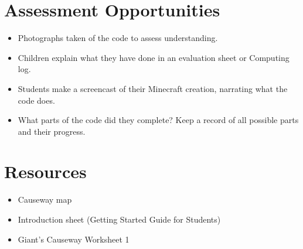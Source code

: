 \documentclass{geocraft-lesson-plan}
\begin{document}
\section*{Assessment Opportunities}
\begin{itemize}
\item Photographs taken of the code to assess understanding. 
\item Children explain what they have done in an evaluation sheet or Computing log.   
\item Students make a screencast of their Minecraft creation, narrating what the code does.
\item What parts of the code did they complete? Keep a record of all possible parts and their progress.
\end{itemize}

\section*{Resources}
\begin{itemize}
\item Causeway map
\item Introduction sheet (Getting Started Guide for Students)
\item Giant’s Causeway Worksheet 1
\end{itemize}
\end{document}
